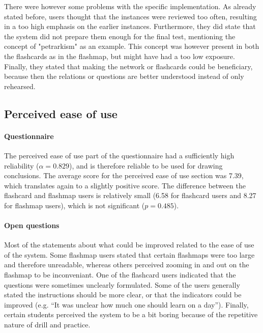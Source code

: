 There were however some problems with the specific implementation. As already stated before, users thought that the instances were reviewed too often, resulting in a too high emphasis on the earlier instances. Furthermore, they did state that the system did not prepare them enough for the final test, mentioning the concept of "petrarkism" as an example. This concept was however present in both the flashcards as in the flashmap, but might have had a too low exposure. Finally, they stated that making the network or flashcards could be beneficiary, because then the relations or questions are better understood instead of only rehearsed.

\subsection{Perceived ease of use}

\paragraph{Questionnaire} The perceived ease of use part of the questionnaire had a sufficiently high reliability ($\alpha=0.829$), and is therefore reliable to be used for drawing conclusions. The average score for the perceived ease of use section was 7.39, which translates again to a slightly positive score. The difference between the flashcard and flashmap users is relatively small (6.58 for flashcard users and 8.27 for flashmap users), which is not significant ($p=0.485$).

\paragraph{Open questions} Most of the statements about what could be improved related to the ease of use of the system. Some flashmap users stated that certain flashmaps were too large and therefore unreadable, whereas others perceived zooming in and out on the flashmap to be inconveniant. One of the flashcard users indicated that the questions were sometimes unclearly formulated. Some of the users generally stated the instructions should be more clear, or that the indicators could be improved (e.g. ``It was unclear how much one should learn on a day''). Finally, certain students perceived the system to be a bit boring because of the repetitive nature of drill and practice.

